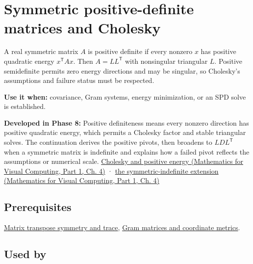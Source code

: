 \hypertarget{appendix-50d2ea3c9b26}{}\label{referencestart:appendix-50d2ea3c9b26}
\section{Symmetric positive-definite matrices and Cholesky}\label{appendix-50d2ea3c9b26-symmetric-positive-definite-matrices-and-cholesky}

\hypertarget{appendix-50d2ea3c9b26-symmetric-positive-definite-matrices-and-cholesky}{}

A real symmetric matrix \(A\) is positive definite if every nonzero \(x\) has positive quadratic energy \(x^\mathsf T A x\). Then \(A=LL^\mathsf T\) with nonsingular triangular \(L\). Positive semidefinite permits zero energy directions and may be singular, so Cholesky's assumptions and failure status must be respected.

\textbf{Use it when:} covariance, Gram systems, energy minimization, or an SPD solve is established.

\textbf{Developed in Phase 8:} Positive definiteness means every nonzero direction has positive quadratic energy, which permits a Cholesky factor and stable triangular solves. The continuation derives the positive pivots, then broadens to \(LDL^\mathsf T\) when a symmetric matrix is indefinite and explains how a failed pivot reflects the assumptions or numerical scale. \href{../02-Mathematics-for-Visual-Computing-P01/main.pdf\#01-foundations-i-ch020-positive-definiteness-is-a-structural-promise}{Cholesky and positive energy (Mathematics for Visual Computing, Part 1, Ch. 4)} · \href{../02-Mathematics-for-Visual-Computing-P01/main.pdf\#01-foundations-i-ch020-ldlt-reaches-symmetric-indefinite-matrices}{the symmetric-indefinite extension (Mathematics for Visual Computing, Part 1, Ch. 4)}

\subsection{Prerequisites}\label{appendix-50d2ea3c9b26-prerequisites}

\hypertarget{appendix-50d2ea3c9b26-prerequisites}{}

\hyperref[appendix-175ca5ff874d]{Matrix transpose symmetry and trace}, \hyperref[appendix-3b863809f82a]{Gram matrices and coordinate metrics}.

\subsection{Used by}\label{appendix-50d2ea3c9b26-used-by}

